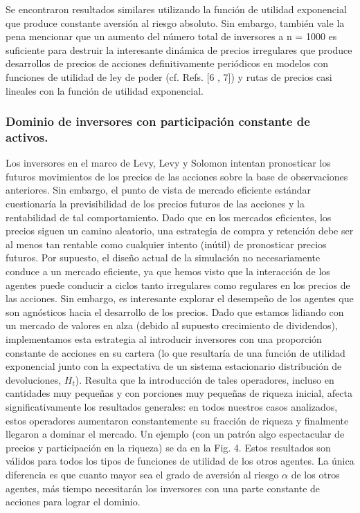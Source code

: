 \documentclass[12pt,a4paper]{article}
\begin{document}
\quad Se encontraron resultados similares utilizando la función de utilidad exponencial que produce constante aversión al riesgo absoluto. Sin embargo, también vale la pena mencionar que un aumento del número total de inversores a n = 1000 es suficiente para destruir la interesante dinámica de precios irregulares que produce desarrollos de precios de acciones definitivamente periódicos en modelos con funciones de utilidad de ley de poder (cf. Refs. [6 , 7]) y rutas de precios casi lineales con la función de utilidad exponencial.
\subsubsection*{Dominio de inversores con participación constante de activos.}
\quad Los inversores en el marco de Levy, Levy y Solomon intentan pronosticar los futuros movimientos de los precios de las acciones sobre la base de observaciones anteriores. Sin embargo, el punto de vista de mercado eficiente estándar cuestionaría la previsibilidad de los precios futuros de las acciones y la rentabilidad de tal comportamiento. Dado que en los mercados eficientes, los precios siguen un camino aleatorio, una estrategia de compra y retención debe ser al menos tan rentable como cualquier intento (inútil) de pronosticar precios futuros. Por supuesto, el diseño actual de la simulación no necesariamente conduce a un mercado eficiente, ya que hemos visto que la interacción de los agentes puede conducir a ciclos tanto irregulares como regulares en los precios de las acciones. Sin embargo, es interesante explorar el desempeño de los agentes que son agnósticos hacia el desarrollo de los precios. Dado que estamos lidiando con un mercado de valores en alza (debido al supuesto crecimiento de dividendos), implementamos esta estrategia al introducir inversores con una proporción constante de acciones en su cartera (lo que resultaría de una función de utilidad exponencial junto con la expectativa de un sistema estacionario distribución de devoluciones, $ H_t $). Resulta que la introducción de tales operadores, incluso en cantidades muy pequeñas y con porciones muy pequeñas de riqueza inicial, afecta significativamente los resultados generales: en todos nuestros casos analizados, estos operadores aumentaron constantemente su fracción de riqueza y finalmente llegaron a dominar el mercado. Un ejemplo (con un patrón algo espectacular de precios y participación en la riqueza) se da en la Fig. 4. Estos resultados son válidos para todos los tipos de funciones de utilidad de los otros agentes. La única diferencia es que cuanto mayor sea el grado de aversión al riesgo $ \alpha $ de los otros agentes, más tiempo necesitarán los inversores con una parte constante de acciones para lograr el dominio.\\
\end{document}
